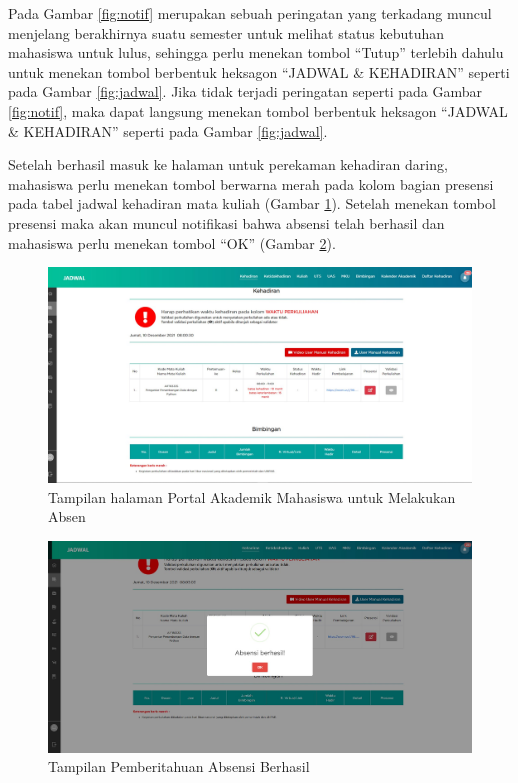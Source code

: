 Pada Gambar \ref{fig:notif} merupakan sebuah peringatan yang terkadang muncul menjelang berakhirnya suatu semester untuk melihat status kebutuhan mahasiswa untuk lulus, sehingga perlu menekan tombol ``Tutup'' terlebih dahulu untuk menekan tombol berbentuk heksagon ``JADWAL \& KEHADIRAN'' seperti pada Gambar \ref{fig:jadwal}. Jika tidak terjadi peringatan seperti pada  Gambar \ref{fig:notif}, maka dapat langsung menekan tombol berbentuk heksagon ``JADWAL \& KEHADIRAN'' seperti pada Gambar \ref{fig:jadwal}.

Setelah berhasil masuk ke halaman untuk perekaman kehadiran daring, mahasiswa perlu menekan tombol berwarna merah pada kolom bagian presensi pada tabel jadwal kehadiran mata kuliah (Gambar \ref{fig:absen}). Setelah menekan tombol presensi maka akan muncul notifikasi bahwa absensi telah berhasil dan mahasiswa perlu menekan tombol ``OK'' (Gambar \ref{fig:berhasil}). 	
\begin{figure}[H]
	\centering
	\includegraphics[scale=0.225]{Gambar/absen.jpg}
	\caption{Tampilan halaman Portal Akademik Mahasiswa untuk Melakukan Absen} 
	\label{fig:absen}
\end{figure}
\begin{figure}[H]
	\centering
	\includegraphics[scale=0.225]{Gambar/berhasilAbsen.jpg}
	\caption{Tampilan Pemberitahuan Absensi Berhasil} 
	\label{fig:berhasil}
\end{figure}


